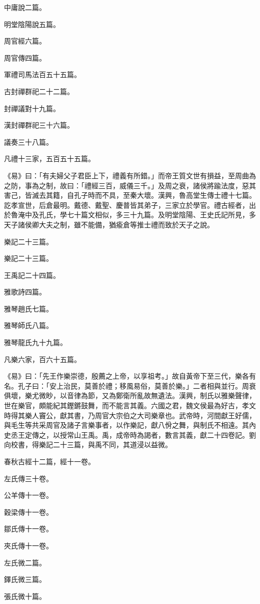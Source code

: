 \begin{pinyinscope}
中庸說二篇。

明堂陰陽說五篇。

周官經六篇。

周官傳四篇。

軍禮司馬法百五十五篇。

古封禪群祀二十二篇。

封禪議對十九篇。

漢封禪群祀三十六篇。

議奏三十八篇。

凡禮十三家，五百五十五篇。

《易》曰：「有夫婦父子君臣上下，禮義有所錯。」而帝王質文世有損益，至周曲為之防，事為之制，故曰：「禮經三百，威儀三千。」及周之衰，諸侯將踰法度，惡其害己，皆滅去其籍，自孔子時而不具，至秦大壞。漢興，魯高堂生傳士禮十七篇。訖孝宣世，后倉最明。戴德、戴聖、慶普皆其弟子，三家立於學官。禮古經者，出於魯淹中及孔氏，學七十篇文相似，多三十九篇。及明堂陰陽、王史氏記所見，多天子諸侯卿大夫之制，雖不能備，猶瘉倉等推士禮而致於天子之說。

樂記二十三篇。

樂記二十三篇。

王禹記二十四篇。

雅歌詩四篇。

雅琴趙氏七篇。

雅琴師氏八篇。

雅琴龍氏九十九篇。

凡樂六家，百六十五篇。

《易》曰：「先王作樂崇德，殷薦之上帝，以享祖考。」故自黃帝下至三代，樂各有名。孔子曰：「安上治民，莫善於禮；移風易俗，莫善於樂。」二者相與並行。周衰俱壞，樂尤微眇，以音律為節，又為鄭衛所亂故無遺法。漢興，制氏以雅樂聲律，世在樂官，頗能紀其鏗鏘鼓舞，而不能言其義。六國之君，魏文侯最為好古，孝文時得其樂人竇公，獻其書，乃周官大宗伯之大司樂章也。武帝時，河間獻王好儒，與毛生等共采周官及諸子言樂事者，以作樂記，獻八佾之舞，與制氏不相遠。其內史丞王定傳之，以授常山王禹。禹，成帝時為謁者，數言其義，獻二十四卷記。劉向校書，得樂記二十三篇，與禹不同，其道浸以益微。

春秋古經十二篇，經十一卷。

左氏傳三十卷。

公羊傳十一卷。

穀梁傳十一卷。

鄒氏傳十一卷。

夾氏傳十一卷。

左氏微二篇。

鐸氏微三篇。

張氏微十篇。


\end{pinyinscope}
